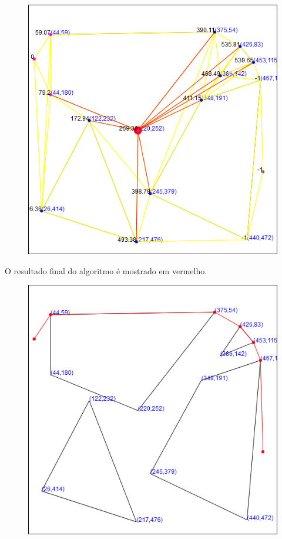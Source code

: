 \documentclass[11pt]{article} %
\begin{document}
\begin{figure}[!htp]
	\begin{center}
		\includegraphics[scale=0.5]{img/dijkstra.png}
	\end{center}	
\end{figure}

\newpage

O resultado final do algoritmo é mostrado em vermelho.

\begin{figure}[!htp]
	\begin{center}
		\includegraphics[scale=0.5]{img/final.png}
	\end{center}	
\end{figure}
\end{document}
